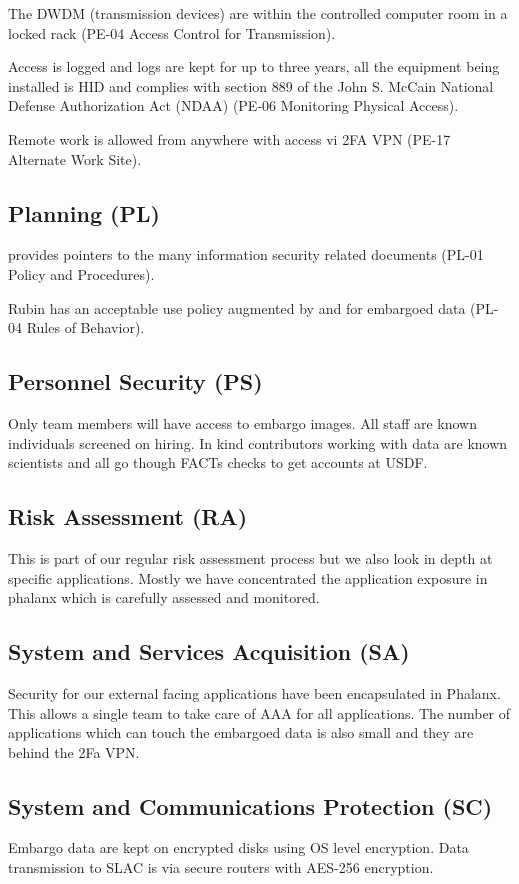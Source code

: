 The DWDM (transmission devices) are within the controlled computer room in a locked rack (PE-04  Access Control for Transmission).

Access is logged and logs are kept for up to three years, all the equipment being installed is HID and complies with section 889 of the John S. McCain National Defense Authorization Act (NDAA) (PE-06  Monitoring Physical Access).

Remote work is allowed  from anywhere with access vi 2FA VPN (PE-17  Alternate Work Site).

\subsection{Planning (PL)} \label{sec:PL}
 provides pointers to the many information security related documents (PL-01  Policy and Procedures).

Rubin has an acceptable use policy  augmented by   and  for embargoed data  (PL-04  Rules of Behavior).

\subsection{Personnel Security (PS)} \label{sec:PS}
Only  team members will have access to embargo images.
All staff are known individuals screened on hiring.
In kind contributors working with data  are known scientists and all go though FACTs checks to get accounts at USDF.


\subsection{Risk Assessment (RA)} \label{sec:RA}
This is part of our regular risk assessment process  but we also look in depth at specific applications.
Mostly we have concentrated the application exposure in phalanx which is carefully assessed and monitored.

\subsection{System and Services Acquisition (SA)} \label{sec:SA}
Security for our external facing applications have been encapsulated in Phalanx.
This allows a single team to take care of AAA for all applications.
The number of applications which can touch the embargoed data is also small and they are behind the 2Fa VPN.


\subsection{System and Communications Protection (SC)} \label{sec:SC}
Embargo data are kept on encrypted disks using OS level encryption.
Data transmission to SLAC is via  secure routers with AES-256 encryption.

